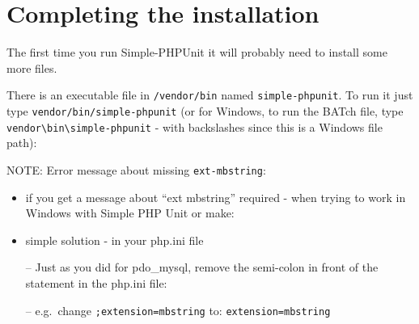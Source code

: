 \documentclass[a4paperpaper,openright]{book}
\newenvironment{Shaded}{}{}
\newcommand{\BuiltInTok}[1]{#1}
\newcommand{\ExtensionTok}[1]{#1}
\newcommand{\NormalTok}[1]{#1}
\begin{document}
\hypertarget{completing-the-installation}{%
\section{Completing the
installation}\label{completing-the-installation}}

The first time you run Simple-PHPUnit it will probably need to install
some more files.

There is an executable file in \texttt{/vendor/bin} named
\texttt{simple-phpunit}. To run it just type
\texttt{vendor/bin/simple-phpunit} (or for Windows, to run the BATch
file, type
\texttt{vendor\textbackslash{}bin\textbackslash{}simple-phpunit} - with
backslashes since this is a Windows file path):

\begin{Shaded}
\end{Shaded}

NOTE: Error message about missing \texttt{ext-mbstring}:

\begin{itemize}
\item
  if you get a message about ``ext mbstring'' required - when trying to
  work in Windows with Simple PHP Unit or make:
\item
  simple solution - in your php.ini file

  -- Just as you did for pdo\_mysql, remove the semi-colon in front of
  the statement in the php.ini file:

  -- e.g.~change \texttt{;extension=mbstring} to:
  \texttt{extension=mbstring}
\end{itemize}
\end{document}
